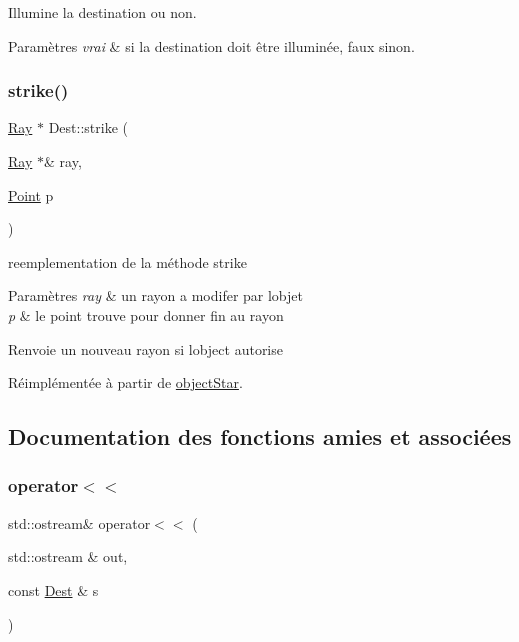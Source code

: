 Illumine la destination ou non. 
\begin{DoxyParams}{Paramètres}
{\em vrai} & si la destination doit être illuminée, faux sinon. \\
\hline
\end{DoxyParams}
\mbox{\label{class_dest_aa48ab5e846f1dbad232bb59ea94c52ee}} 
\subsubsection{\texorpdfstring{strike()}{strike()}}
{\footnotesize\ttfamily \mbox{\hyperlink{class_ray}{Ray}} $\ast$ Dest\+::strike (\begin{DoxyParamCaption}\item[{\mbox{\hyperlink{class_ray}{Ray}} $\ast$\&}]{ray,  }\item[{\mbox{\hyperlink{class_point}{Point}}}]{p }\end{DoxyParamCaption})\hspace{0.3cm}{\ttfamily [virtual]}}

reemplementation de la méthode strike 
\begin{DoxyParams}{Paramètres}
{\em ray} & un rayon a modifer par l\textquotesingle{}objet \\
\hline
{\em p} & le point trouve pour donner fin au rayon \\
\hline
\end{DoxyParams}
\begin{DoxyReturn}{Renvoie}
un nouveau rayon si l\textquotesingle{}object autorise 
\end{DoxyReturn}


Réimplémentée à partir de \mbox{\hyperlink{classobject_star_a5155713af07f8397057706a1eeb843ed}{object\+Star}}.



\subsection{Documentation des fonctions amies et associées}
\mbox{\label{class_dest_a256a3d2bff5f10395424d5dc911a2b4e}} 
\subsubsection{\texorpdfstring{operator$<$$<$}{operator<<}}
{\footnotesize\ttfamily std\+::ostream\& operator$<$$<$ (\begin{DoxyParamCaption}\item[{std\+::ostream \&}]{out,  }\item[{const \mbox{\hyperlink{class_dest}{Dest}} \&}]{s }\end{DoxyParamCaption})\hspace{0.3cm}{\ttfamily [friend]}}

